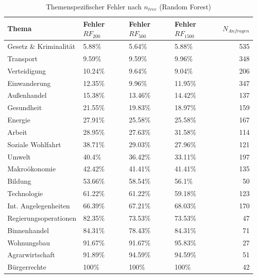 \begin{table}[ht]
\centering
\caption{Themenspezifischer Fehler nach $n_{tree}$ (Random Forest)}
\begin{tabular}{llllr}
  \hline
  Thema & Fehler $RF_{200}$ & Fehler $RF_{500}$ & Fehler $RF_{1500}$ & $N_{Anfragen}$ \\ 
  \hline
  Gesetz \& Kriminalität & 5.88\% & 5.64\% & 5.88\% & 535 \\ 
   Transport & 9.59\% & 9.59\% & 9.96\% & 348 \\ 
   Verteidigung & 10.24\% & 9.64\% & 9.04\% & 206 \\ 
   Einwanderung & 12.35\% & 9.96\% & 11.95\% & 347 \\ 
   Außenhandel & 15.38\% & 13.46\% & 14.42\% & 137 \\ 
   Gesundheit & 21.55\% & 19.83\% & 18.97\% & 159 \\ 
   Energie & 27.91\% & 25.58\% & 25.58\% & 167 \\ 
   Arbeit & 28.95\% & 27.63\% & 31.58\% & 114 \\ 
   Soziale Wohlfahrt & 38.71\% & 29.03\% & 27.96\% & 121 \\ 
   Umwelt & 40.4\% & 36.42\% & 33.11\% & 197 \\ 
   Makroökonomie & 42.42\% & 41.41\% & 41.41\% & 135 \\ 
   Bildung & 53.66\% & 58.54\% & 56.1\% &  50 \\ 
   Technologie & 61.22\% & 61.22\% & 59.18\% & 123 \\ 
   Int. Angelegenheiten & 66.39\% & 67.21\% & 68.03\% & 170 \\ 
   Regierungsoperationen & 82.35\% & 73.53\% & 73.53\% &  47 \\ 
   Binnenhandel & 84.31\% & 78.43\% & 84.31\% &  71 \\ 
   Wohnungsbau & 91.67\% & 91.67\% & 95.83\% &  27 \\ 
   Agrarwirtschaft & 91.89\% & 94.59\% & 94.59\% &  51 \\ 
   Bürgerrechte & 100\% & 100\% & 100\% &  42 \\ 
   \hline
\end{tabular}
\end{table}

